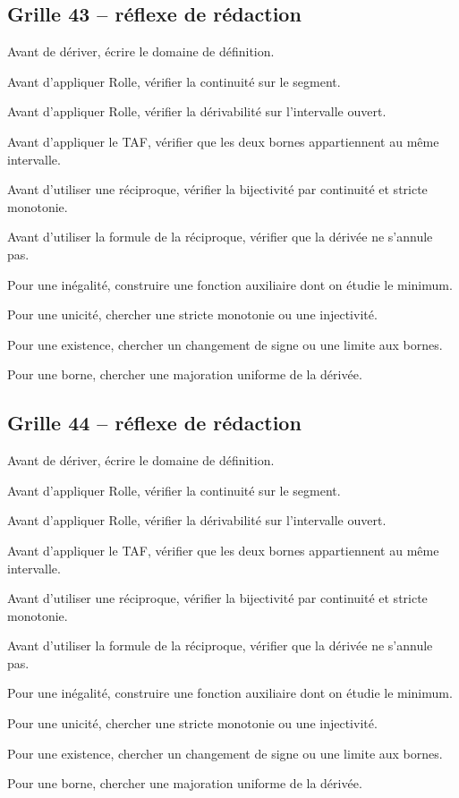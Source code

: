 \documentclass[11pt,a4paper]{article}
\begin{document}
\subsection*{Grille 43 -- réflexe de rédaction}

\begin{methodebox}

Avant de dériver, écrire le domaine de définition.

Avant d'appliquer Rolle, vérifier la continuité sur le segment.

Avant d'appliquer Rolle, vérifier la dérivabilité sur l'intervalle ouvert.

Avant d'appliquer le TAF, vérifier que les deux bornes appartiennent au même intervalle.

Avant d'utiliser une réciproque, vérifier la bijectivité par continuité et stricte monotonie.

Avant d'utiliser la formule de la réciproque, vérifier que la dérivée ne s'annule pas.

Pour une inégalité, construire une fonction auxiliaire dont on étudie le minimum.

Pour une unicité, chercher une stricte monotonie ou une injectivité.

Pour une existence, chercher un changement de signe ou une limite aux bornes.

Pour une borne, chercher une majoration uniforme de la dérivée.

\end{methodebox}

\subsection*{Grille 44 -- réflexe de rédaction}

\begin{methodebox}

Avant de dériver, écrire le domaine de définition.

Avant d'appliquer Rolle, vérifier la continuité sur le segment.

Avant d'appliquer Rolle, vérifier la dérivabilité sur l'intervalle ouvert.

Avant d'appliquer le TAF, vérifier que les deux bornes appartiennent au même intervalle.

Avant d'utiliser une réciproque, vérifier la bijectivité par continuité et stricte monotonie.

Avant d'utiliser la formule de la réciproque, vérifier que la dérivée ne s'annule pas.

Pour une inégalité, construire une fonction auxiliaire dont on étudie le minimum.

Pour une unicité, chercher une stricte monotonie ou une injectivité.

Pour une existence, chercher un changement de signe ou une limite aux bornes.

Pour une borne, chercher une majoration uniforme de la dérivée.

\end{methodebox}
\end{document}

